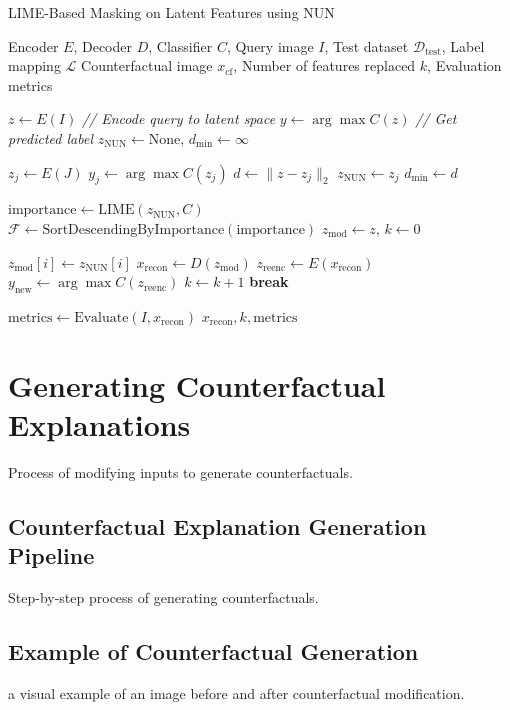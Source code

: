\begin{algorithm}[H]
\caption{LIME-Based Masking on Latent Features using NUN}
\label{alg:nun_lime}
\begin{algorithmic}[1]
\REQUIRE Encoder $E$, Decoder $D$, Classifier $C$, Query image $I$, Test dataset $\mathcal{D}_{\text{test}}$, Label mapping $\mathcal{L}$
\ENSURE Counterfactual image $x_{\text{cf}}$, Number of features replaced $k$, Evaluation metrics

\STATE $z \leftarrow E(I)$ \hfill \textit{// Encode query to latent space}
\STATE $y \leftarrow \arg\max C(z)$ \hfill \textit{// Get predicted label}
\STATE $z_{\text{NUN}} \leftarrow \text{None}$, $d_{\min} \leftarrow \infty$

    \STATE $z_j \leftarrow E(J)$
    \STATE $y_j \leftarrow \arg\max C(z_j)$
        \STATE $d \leftarrow \|z - z_j\|_2$
            \STATE $z_{\text{NUN}} \leftarrow z_j$
            \STATE $d_{\min} \leftarrow d$
        \ENDIF
    \ENDIF
\ENDFOR

\STATE $\text{importance} \leftarrow \text{LIME}(z_{\text{NUN}}, C)$
\STATE $\mathcal{F} \leftarrow \text{SortDescendingByImportance}(\text{importance})$
\STATE $z_{\text{mod}} \leftarrow z$, $k \leftarrow 0$

    \STATE $z_{\text{mod}}[i] \leftarrow z_{\text{NUN}}[i]$
    \STATE $x_{\text{recon}} \leftarrow D(z_{\text{mod}})$
    \STATE $z_{\text{reenc}} \leftarrow E(x_{\text{recon}})$
    \STATE $y_{\text{new}} \leftarrow \arg\max C(z_{\text{reenc}})$
    \STATE $k \leftarrow k + 1$
        \STATE \textbf{break}
    \ENDIF
\ENDFOR

\STATE $\text{metrics} \leftarrow \text{Evaluate}(I, x_{\text{recon}})$
\RETURN $x_{\text{recon}}, k, \text{metrics}$
\end{algorithmic}
\end{algorithm}








\section{Generating Counterfactual Explanations}
Process of modifying inputs to generate counterfactuals.

\subsection{Counterfactual Explanation Generation Pipeline}
Step-by-step process of generating counterfactuals.


\subsection{Example of Counterfactual Generation}
a visual example of an image before and after counterfactual modification.